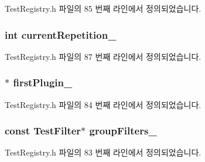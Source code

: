 Test\+Registry.\+h 파일의 85 번째 라인에서 정의되었습니다.

\subsubsection[{\texorpdfstring{current\+Repetition\+\_\+}{currentRepetition_}}]{\setlength{\rightskip}{0pt plus 5cm}int current\+Repetition\+\_\+\hspace{0.3cm}{\ttfamily [private]}}\hypertarget{class_test_registry_a7f21fe6b11eb96d498bb1890f70932de}{}\label{class_test_registry_a7f21fe6b11eb96d498bb1890f70932de}


Test\+Registry.\+h 파일의 87 번째 라인에서 정의되었습니다.

\subsubsection[{\texorpdfstring{first\+Plugin\+\_\+}{firstPlugin_}}]{$\ast$ first\+Plugin\+\_\+\hspace{0.3cm}{\ttfamily [private]}}\hypertarget{class_test_registry_a87b15684d847549532b2219d0e4d3d83}{}\label{class_test_registry_a87b15684d847549532b2219d0e4d3d83}


Test\+Registry.\+h 파일의 84 번째 라인에서 정의되었습니다.

\subsubsection[{\texorpdfstring{group\+Filters\+\_\+}{groupFilters_}}]{\setlength{\rightskip}{0pt plus 5cm}const {\bf Test\+Filter}$\ast$ group\+Filters\+\_\+\hspace{0.3cm}{\ttfamily [private]}}\hypertarget{class_test_registry_ad16b28b9a22a924a6265edceab863e92}{}\label{class_test_registry_ad16b28b9a22a924a6265edceab863e92}


Test\+Registry.\+h 파일의 83 번째 라인에서 정의되었습니다.

